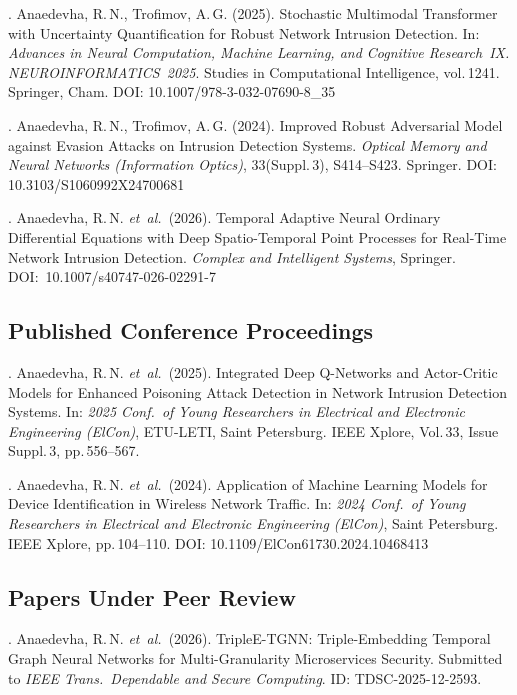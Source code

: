 . Anaedevha, R.\,N., Trofimov, A.\,G. (2025). Stochastic Multimodal Transformer with Uncertainty Quantification for Robust Network Intrusion Detection. In: \textit{Advances in Neural Computation, Machine Learning, and Cognitive Research~IX. NEUROINFORMATICS~2025}. Studies in Computational Intelligence, vol.\,1241. Springer, Cham. DOI: 10.1007/978-3-032-07690-8\_35

. Anaedevha, R.\,N., Trofimov, A.\,G. (2024). Improved Robust Adversarial Model against Evasion Attacks on Intrusion Detection Systems. \textit{Optical Memory and Neural Networks (Information Optics)}, 33(Suppl.\,3), S414--S423. Springer. DOI: 10.3103/S1060992X24700681

. Anaedevha, R.\,N. \textit{et~al.}\ (2026). Temporal Adaptive Neural Ordinary Differential Equations with Deep Spatio-Temporal Point Processes for Real-Time Network Intrusion Detection. \textit{Complex and Intelligent Systems}, Springer. DOI:~10.1007/s40747-026-02291-7


\subsection*{Published Conference Proceedings}

. Anaedevha, R.\,N. \textit{et~al.}\ (2025). Integrated Deep Q-Networks and Actor-Critic Models for Enhanced Poisoning Attack Detection in Network Intrusion Detection Systems. In: \textit{2025 Conf.\ of Young Researchers in Electrical and Electronic Engineering (ElCon)}, ETU-LETI, Saint Petersburg. IEEE Xplore, Vol.\,33, Issue Suppl.\,3, pp.\,556--567.

. Anaedevha, R.\,N. \textit{et~al.}\ (2024). Application of Machine Learning Models for Device Identification in Wireless Network Traffic. In: \textit{2024 Conf.\ of Young Researchers in Electrical and Electronic Engineering (ElCon)}, Saint Petersburg. IEEE Xplore, pp.\,104--110. DOI: 10.1109/ElCon61730.2024.10468413

\subsection*{Papers Under Peer Review}

. Anaedevha, R.\,N. \textit{et~al.}\ (2026). TripleE-TGNN: Triple-Embedding Temporal Graph Neural Networks for Multi-Granularity Microservices Security. Submitted to \textit{IEEE Trans.\ Dependable and Secure Computing}. ID: TDSC-2025-12-2593.

